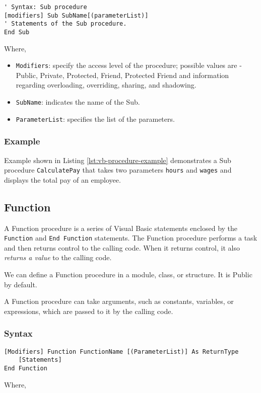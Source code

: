 \begin{lstlisting}[style=vb, numbers=none]
' Syntax: Sub procedure	
[modifiers] Sub SubName[(parameterList)]
' Statements of the Sub procedure.
End Sub
\end{lstlisting}
Where,
\begin{itemize}
	\item \texttt{Modifiers}: specify the access level of the procedure; possible values are - Public, Private, Protected, Friend, Protected Friend and information regarding overloading, overriding, sharing, and shadowing.

	\item \texttt{SubName}: indicates the name of the Sub.

	\item \texttt{ParameterList}:  specifies the list of the parameters.
\end{itemize}

\subsubsection*{Example}
Example shown in Listing {\ref{lst:vb-procedure-example}} demonstrates a Sub procedure \texttt{CalculatePay} that takes two parameters \texttt{hours} and \texttt{wages} and displays the total pay of an employee.



\subsection{Function}
A Function procedure is a series of Visual Basic statements enclosed by the \texttt{Function} and \texttt{End Function} statements. The Function procedure performs a task and then returns control to the calling code. When it returns control, it also \textit{returns a value} to the calling code.

We can define a Function procedure in a module, class, or structure. It is Public by default.

A Function procedure can take arguments, such as constants, variables, or expressions, which are passed to it by the calling code.

\subsubsection*{Syntax}
\begin{lstlisting}[style=vb]
[Modifiers] Function FunctionName [(ParameterList)] As ReturnType
	[Statements]
End Function
\end{lstlisting}
Where,

